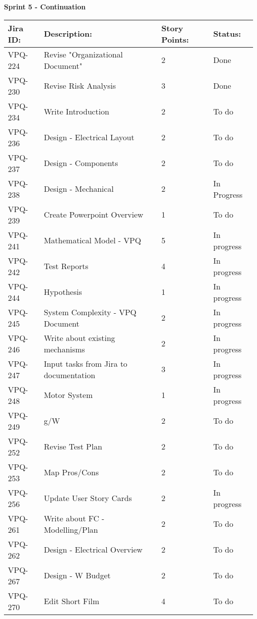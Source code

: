 \begin{table}[ht]
\centering\textbf{Sprint 5 - Continuation}
\begin{tabularx}{\linewidth}{|m{1.5cm} m{8.3cm} m{1.5cm} m{3.5cm}|}
\hline
    \rowcolor{cadetgrey} 
     \textbf{Jira ID:} & \textbf{Description:} &  \textbf{Story Points:} & \textbf{Status: } \\ \hline
      VPQ-224 & Revise "Organizational Document" & 2\centering & Done  \\
\rowcolor{gainsboro} VPQ-230 & Revise Risk Analysis & 3\centering & Done  \\    
      VPQ-234 & Write Introduction & 2\centering & To do  \\
\rowcolor{gainsboro}  VPQ-236 & Design - Electrical Layout & 2\centering & To do  \\
      VPQ-237 & Design - Components & 2\centering & To do  \\
\rowcolor{gainsboro}  VPQ-238 & Design - Mechanical & 2\centering & In Progress  \\
      VPQ-239 & Create Powerpoint Overview & 1\centering & To do  \\
\rowcolor{gainsboro}  VPQ-241 & Mathematical Model - VPQ & 5\centering & In progress  \\
      VPQ-242 & Test Reports & 4\centering & In progress\\
\rowcolor{gainsboro}  VPQ-244 & Hypothesis & 1\centering & In progress  \\
      VPQ-245 & System Complexity - VPQ Document & 2\centering & In progress  \\
\rowcolor{gainsboro}  VPQ-246 & Write about existing mechanisms & 2\centering & In progress  \\
      VPQ-247 & Input tasks from Jira to documentation & 3\centering & In progress  \\
\rowcolor{gainsboro}  VPQ-248 & Motor System & 1\centering & In progress  \\
      VPQ-249 & g/W & 2\centering & To do  \\
\rowcolor{gainsboro}  VPQ-252 & Revise Test Plan & 2\centering & To do  \\
      VPQ-253 & Map Pros/Cons & 2\centering & To do  \\
\rowcolor{gainsboro}  VPQ-256 & Update User Story Cards & 2\centering & In progress  \\
      VPQ-261 & Write about FC - Modelling/Plan & 2\centering & To do  \\
\rowcolor{gainsboro}  VPQ-262 & Design - Electrical Overview & 2\centering & To do  \\
      VPQ-267 & Design - W Budget & 2\centering & To do  \\
\rowcolor{gainsboro}  VPQ-270 & Edit Short Film & 4\centering & To do  \\

\hline    
\end{tabularx}
\end{table}





